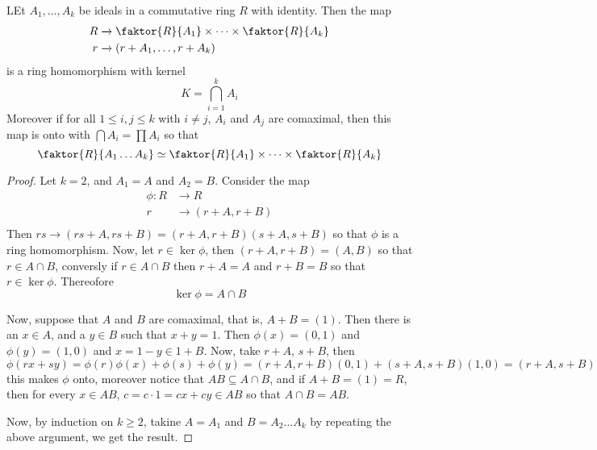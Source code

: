 \begin{theorem}\label{1.6.1}
    LEt $A_1, \dots, A_k$ be ideals in a commutative ring $R$ with identity.
    Then the map
    \begin{align*}
        R   &   \xrightarrow{} \faktor{R}{A_1} \times \dots \times
        \faktor{R}{A_k} \\
        r   &   \xrightarrow{} (r+A_1, \dots, r+A_k)    \\
    \end{align*}
    is a ring homomorphism with kernel
    \begin{equation*}
        K=\bigcap_{i=1}^k{A_i}
    \end{equation*}
    Moreover if for all $1 \leq i,j \leq k$ with  $i \neq j$,  $A_i$ and  $A_j$
    are comaximal, then this map is onto with  $\bigcap{A_i}=\prod{A_i}$ so that
    \begin{equation*}
        \faktor{R}{A_1 \dots A_k} \simeq \faktor{R}{A_1} \times \dots \times
        \faktor{R}{A_k}
    \end{equation*}
\end{theorem}
\begin{proof}
    Let $k=2$, and  $A_1=A$ and $A_2=B$. Consider the map
    \begin{align*}
        \phi:R  &   \xrightarrow{} R  \\
        r   &   \xrightarrow{}  (r+A,r+B)   \\
    \end{align*}
    Then $rs \xrightarrow{} (rs+A,rs+B)=(r+A,r+B)(s+A,s+B)$ so that $\phi$ is a
    ring homomorphism. Now, let  $r \in \ker{\phi}$, then $(r+A,r+B)=(A,B)$ so
    that $r \in A \cap B$, conversly if  $r \in A \cap B$ then  $r+A=A$ and
    $r+B=B$ so that  $r \in \ker{\phi}$. Thereofore
    \begin{equation*}
        \ker{\phi}=A \cap B
    \end{equation*}

    Now, suppose that $A$ and  $B$ are comaximal, that is, $A+B=(1)$. Then there
    is an  $x \in A$, and a  $y \in B$ such that  $x+y=1$. Then $\phi(x)=(0,1)$
    and $\phi(y)=(1,0)$ and $x=1-y \in 1+B$. Now, take  $r+A$,  $s+B$, then
    \begin{equation*}
        \phi(rx+sy)=\phi(r)\phi(x)+\phi(s)+\phi(y)=(r+A,r+B)(0,1)+(s+A,s+B)(1,0)
        =(r+A,s+B)
    \end{equation*}
     this makes $\phi$ onto, moreover notice that  $AB \subseteq A \cap B$, and
     if  $A+B=(1)=R$, then for every $x \in AB$,  $c=c \cdot 1=cx+cy \in AB$ so
     that  $A \cap B=AB$.

     Now, by induction on $k \geq 2$, takine  $A=A_1$ and $B=A_2 \dots A_k$ by
     repeating the above argument, we get the result.
\end{proof}
